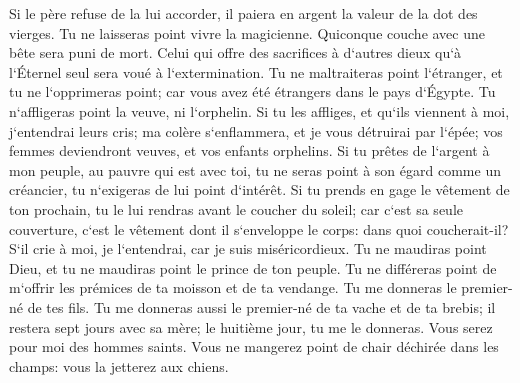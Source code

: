\verse Si le père refuse de la lui accorder, il paiera en argent la valeur de la dot des vierges. 
\verse Tu ne laisseras point vivre la magicienne. 
\verse Quiconque couche avec une bête sera puni de mort. 
\verse Celui qui offre des sacrifices à d`autres dieux qu`à l`Éternel seul sera voué à l`extermination. 
\verse Tu ne maltraiteras point l`étranger, et tu ne l`opprimeras point; car vous avez été étrangers dans le pays d`Égypte. 
\verse Tu n`affligeras point la veuve, ni l`orphelin. 
\verse Si tu les affliges, et qu`ils viennent à moi, j`entendrai leurs cris; 
\verse ma colère s`enflammera, et je vous détruirai par l`épée; vos femmes deviendront veuves, et vos enfants orphelins. 
\verse Si tu prêtes de l`argent à mon peuple, au pauvre qui est avec toi, tu ne seras point à son égard comme un créancier, tu n`exigeras de lui point d`intérêt. 
\verse Si tu prends en gage le vêtement de ton prochain, tu le lui rendras avant le coucher du soleil; 
\verse car c`est sa seule couverture, c`est le vêtement dont il s`enveloppe le corps: dans quoi coucherait-il? S`il crie à moi, je l`entendrai, car je suis miséricordieux. 
\verse Tu ne maudiras point Dieu, et tu ne maudiras point le prince de ton peuple. 
\verse Tu ne différeras point de m`offrir les prémices de ta moisson et de ta vendange. Tu me donneras le premier-né de tes fils. 
\verse Tu me donneras aussi le premier-né de ta vache et de ta brebis; il restera sept jours avec sa mère; le huitième jour, tu me le donneras. 
\verse Vous serez pour moi des hommes saints. Vous ne mangerez point de chair déchirée dans les champs: vous la jetterez aux chiens. 

\chapter{}


